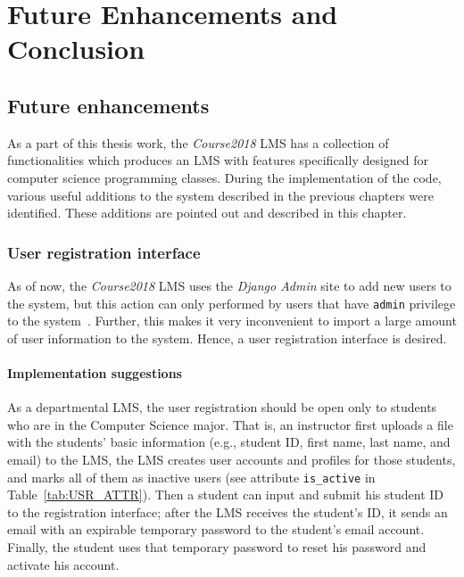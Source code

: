 

\chapter{Future Enhancements and Conclusion}
\label{chap:FUTURE}

\section{Future enhancements}
As a part of this thesis work, 
the \emph{Course2018} LMS has a collection of functionalities which produces an
LMS with features specifically designed for computer science programming
classes.
During the implementation of the code, various useful additions to the system
described in the previous chapters were identified.
These additions are pointed out and described in this chapter.

\subsection{User registration interface}
As of now, the \emph{Course2018} LMS uses the \emph{Django Admin} site to
add new users to the system, but this action can only performed by users that
have \texttt{admin} privilege to the system~\cite{AdjangoAdmin}. Further, this
makes it very inconvenient to import a large amount of user information to the system.
Hence, a user registration interface is desired.

\subsubsection{Implementation suggestions}
As a departmental LMS, the user registration should be open only to students
who are in the Computer Science major.
That is, an instructor first uploads a file with the students' basic information
(e.g., student ID, first name, last name, and email) to the LMS, the LMS
creates user accounts and profiles for those students, and marks all of them
as inactive users (see attribute \texttt{is\_active} in
Table~\ref{tab:USR_ATTR}).
Then a student can input and submit his student ID to the registration
interface; after the LMS receives the student's ID,
it sends an email with an expirable temporary password to the student's
email account.
Finally, the student uses that temporary password to reset his password and
activate his account.

